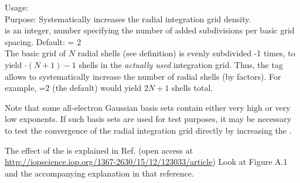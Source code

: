 {
  Usage:   \\[1.0ex]
  Purpose: Systematically increases the radial integration grid
  density. \\[1.0ex]
   is an integer, number specifying the number of
    added subdivisions per basic grid spacing. Default: 
    = 2 \\
}
The basic grid of $N$ radial shells (see
 definition) is evenly subdivided
-1 times, to yield $\cdot (N+1) - 1$
shells in the \emph{actually used} integration grid. Thus, the
 tag allows to systematically
increase the number of radial shells (by factors). For example,
=2 (the default) would yield $2N+1$ shells total.

Note that some all-electron Gaussian basis sets contain either very
high or very low exponents. If such basis sets are used for test
purposes, it may be necessary to test the convergence of the radial
integration grid directly by increasing the
. 

The effect of the is explained
in Ref. \cite{Zhang2013} 
(open access at \url{http://iopscience.iop.org/1367-2630/15/12/123033/article})
Look at Figure A.1 and the accompanying explanation in that reference.
